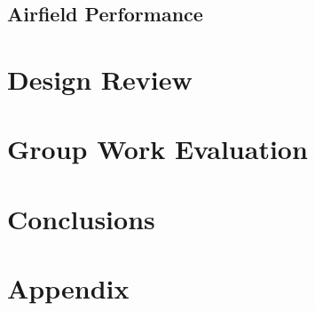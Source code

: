 \documentclass[stu, a4paper, 12pt, floatsintext]{apa7}
\numberwithin{figure}{section}
\numberwithin{table}{section}
\numberwithin{equation}{section}
\begin{document}
\subsection{Airfield Performance}
\section{Design Review}
\section{Group Work Evaluation}
\section{Conclusions}

\section{Appendix}

\printbibliography
\end{document}

